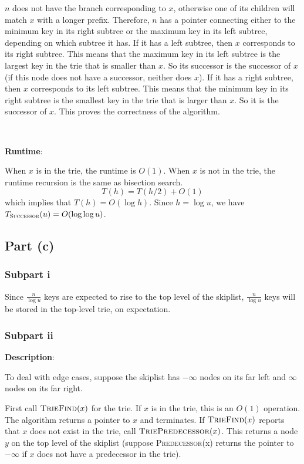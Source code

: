 \documentclass{article}
\begin{document}
$n$ does not have the branch corresponding to $x$, otherwise one of its children will match $x$ with a longer prefix. Therefore, $n$ has a pointer connecting either to the minimum key in its right subtree or the maximum key in its left subtree, depending on which subtree it has. If it has a left subtree, then $x$ corresponds to its right subtree. This means that the maximum key in its left subtree is the largest key in the trie that is smaller than $x$. So its successor is the successor of $x$ (if this node does not have a successor, neither does $x$). If it has a right subtree, then $x$ corresponds to its left subtree. This means that the minimum key in its right subtree is the smallest key in the trie that is larger than $x$. So it is the successor of $x$. This proves the correctness of the algorithm.

~

\noindent\textbf{Runtime}:

When $x$ is in the trie, the runtime is $O(1)$. When $x$ is not in the trie, the runtime recursion is the same as bisection search.
\begin{equation*}
T(h)=T(h/2)+O(1)
\end{equation*}
which implies that $T(h)=O(\log h)$. Since $h=\log u$, we have $T_{\textsc{Successor}}(u)=O(\log\log u)$.

\subsection{Part (c)}
\subsubsection{Subpart i}
Since $\frac{n}{\log u}$ keys are expected to rise to the top level of the skiplist, $\frac{n}{\log u}$ keys will be stored in the top-level trie, on expectation.

\subsubsection{Subpart ii}
\noindent\textbf{Description}:

To deal with edge cases, suppose the skiplist has $-\infty$ nodes on its far left and $\infty$ nodes on its far right.

First call $\textsc{TrieFind}(x)$ for the trie. If $x$ is in the trie, this is an $O(1)$ operation. The algorithm returns a pointer to $x$ and terminates. If $\textsc{TrieFind}(x)$ reports that $x$ does not exist in the trie, call $\textsc{TriePredecessor}(x)$. This returns a node $y$ on the top level of the skiplist (suppose \textsc{Predecessor}(x) returns the pointer to $-\infty$ if $x$ does not have a predecessor in the trie).
\end{document}
